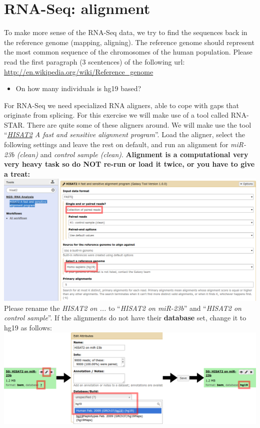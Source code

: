 \documentclass[11pt,a4paper]{article}
\begin{document}
\section{RNA-Seq: alignment}
To make more sense of the RNA-Seq data, we try to find the sequences back in the reference genome (mapping, aligning). The reference
genome should represent the most common sequence of the chromosomes of the human population. Please read the first paragraph (3 scentences) of the following url: \url{http://en.wikipedia.org/wiki/Reference_genome}
\begin{itemize}
	\item On how many individuals is hg19 based?
\end{itemize}
For RNA-Seq we need specialized RNA aligners, able to cope with gaps that originate from splicing. For this exercise we will make use of a tool called RNA-STAR. There are quite some of these aligners around. We will make use the tool ``\textit{\underline{HISAT2} A fast and sensitive alignment program}''. Load the aligner, select the following settings and leave the rest on default, and run an alignment for \textit{miR-23b (clean)} and \textit{control sample (clean)}. \textbf{Alignment is a computational very very heavy task so do NOT re-run or load it twice, or you have to give a treat:}\\
\includegraphics[width=\textwidth]{figures/alignment_01.png}\\
Please rename the \textit{HISAT2 on ...} to ``\textit{HISAT2 on miR-23b}'' and ``\textit{HISAT2 on control sample}''.
If the alignments do not have their \textbf{database} set, change it to hg19 as follows:\\
\includegraphics[width=\textwidth]{figures/alignment_02.png}\\
\end{document}
